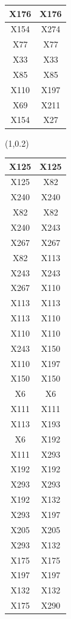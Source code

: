 \documentclass{beamer}
\newcommand{\boz}{\cellcolor{pathwaynode}}
\begin{document}
\begin{frame}[plain]
\begin{textblock*}{\paperwidth}
\begin{tabular}{| c c |}
X176   &  X176  \\ \hline
X154   &  X274  \\ \hline
X77   &  X77  \\ \hline
X33   &  X33  \\ \hline
X85   &  X85  \\ \hline
X110   &  X197  \\ \hline
X69   &  X211  \\ \hline
X154   &  X27  \\ \hline
    \end{tabular}
    \hspace{.5em}
  \end{textblock*}
  \begin{textblock*}{\paperwidth}(1\textwidth,0.2\textheight)
    \raggedright 
    \tiny
    \begin{tabular}{| c c |}
      \hline
\boz X125   &  \boz X125  \\ \hline
\boz X125   &  \boz X82  \\ \hline
\boz X240   &  \boz X240  \\ \hline
\boz X82   &  \boz X82  \\ \hline
\boz X240   &  \boz X243  \\ \hline
X267   &  X267  \\ \hline
\boz X82   &  \boz X113  \\ \hline
\boz X243   &  \boz X243  \\ \hline
X267   &  X110  \\ \hline
\boz X113   &  \boz X113  \\ \hline
\boz X113   &  X110  \\ \hline
X110   &  X110  \\ \hline
\boz X243   &  \boz X150  \\ \hline
X110   &  X197  \\ \hline
\boz X150   &  \boz X150  \\ \hline
X6   &  X6  \\ \hline
X111   &  X111  \\ \hline
\boz X113   &  \boz X193  \\ \hline
X6   &  X192  \\ \hline
X111   &  X293  \\ \hline
X192   &  X192  \\ \hline
X293   &  X293  \\ \hline
X192   &  X132  \\ \hline
X293   &  X197  \\ \hline
X205   &  X205  \\ \hline
X293   &  X132  \\ \hline
X175   &  X175  \\ \hline
X197   &  X197  \\ \hline
X132   &  X132  \\ \hline
X175   &  X290  \\ \hline
    \end{tabular}
    \hspace{.5em}
  \end{textblock*}
\end{frame}
\end{document}
